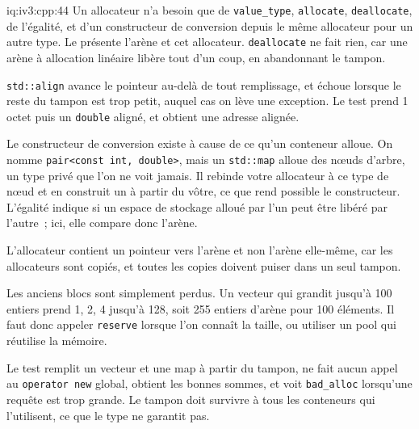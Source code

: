 \begin{solution}{iq:iv3:cpp:44}
Un allocateur n'a besoin que de \texttt{value\_type}, \texttt{allocate}, \texttt{deallocate}, de l'égalité, et d'un constructeur de conversion depuis le même allocateur pour un autre type. Le  présente l'arène et cet allocateur. \texttt{deallocate} ne fait rien, car une arène à allocation linéaire libère tout d'un coup, en abandonnant le tampon.
\label{lst:iv3:cp:arena}

\texttt{std::align} avance le pointeur au-delà de tout remplissage, et échoue lorsque le reste du tampon est trop petit, auquel cas on lève une exception. Le test prend 1 octet puis un \texttt{double} aligné, et obtient une adresse alignée.

Le constructeur de conversion existe à cause de ce qu'un conteneur alloue. On nomme \texttt{pair<const int, double>}, mais un \texttt{std::map} alloue des nœuds d'arbre, un type privé que l'on ne voit jamais. Il rebinde votre allocateur à ce type de nœud et en construit un à partir du vôtre, ce que rend possible le constructeur. L'égalité indique si un espace de stockage alloué par l'un peut être libéré par l'autre~; ici, elle compare donc l'arène.

L'allocateur contient un pointeur vers l'arène et non l'arène elle-même, car les allocateurs sont copiés, et toutes les copies doivent puiser dans un seul tampon.

Les anciens blocs sont simplement perdus. Un vecteur qui grandit jusqu'à 100 entiers prend 1, 2, 4 jusqu'à 128, soit 255 entiers d'arène pour 100 éléments. Il faut donc appeler \texttt{reserve} lorsque l'on connaît la taille, ou utiliser un pool qui réutilise la mémoire.

Le test remplit un vecteur et une map à partir du tampon, ne fait aucun appel au \texttt{operator new} global, obtient les bonnes sommes, et voit \texttt{bad\_alloc} lorsqu'une requête est trop grande. Le tampon doit survivre à tous les conteneurs qui l'utilisent, ce que le type ne garantit pas.

\end{solution}

